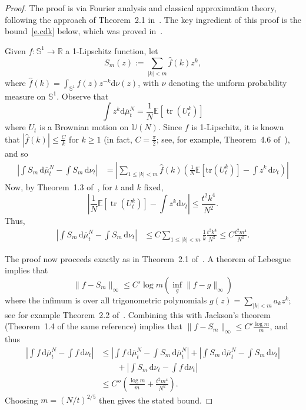 \documentclass[11pt]{article}
\theoremstyle{definition}
\numberwithin{equation}{section}
\numberwithin{figure}{section}
\numberwithin{table}{section}
\DeclareMathOperator{\tr}{tr}
\newcommand{\Unitary}[1]{\mathbb{U}\left(#1\right)}
\newcommand{\E}{\mathbb{E}}
\newcommand*{\dd}{\mathrm{d}}
\newcommand*{\dnu}{\dd \nu}
\newcommand*{\dbmu}{\dd \overline{\mu}}
\begin{document}
\begin{proof}
The proof is via Fourier analysis and classical approximation theory, following the approach of Theorem~2.1 in~\cite{MM-PTRF-2013}. The key ingredient of this proof is the bound~\eqref{e.cdk} below, which was proved in~\cite{CDK2016}.

Given $f:\mathbb{S}^1\rightarrow\mathbb{R}$ a 1-Lipschitz function, let
\[
S_m(z) := \sum_{|k|<m} \hat{f}(k)z^{k},
\]
where $\hat{f}(k)=\int_{\mathbb{S}^1}f(z)z^{-k}\dnu(z)$, with $\nu$ denoting the uniform probability measure on $\mathbb{S}^1$. Observe that
\[
\int z^k\dbmu^N_t=\frac{1}{N}\E[\tr(U_t^k)]
\]
where $U_t$ is a Brownian motion on $\Unitary{N}$. Since $f$ is 1-Lipschitz, it is known that $|\hat{f}(k)|\le \frac{C}{k}$ for $k\ge 1$ (in fact, $C=\frac{\pi}{2}$; see, for example, Theorem~4.6 of~\cite{Katznelson2004}), and so
\begin{align*}
\left|\int S_m\,\dbmu^N_t -\int S_m\,\dnu_t\right| &= \left|\sum_{1\le|k|<m} \hat{f}(k)
\left(\frac{1}{N}\mathbb{E}[\mathrm{tr} (U_t^k)] - \int z^k\,\dnu_t\right) \right|
\end{align*}
Now, by Theorem~1.3 of~\cite{CDK2016}, for $t$ and $k$ fixed,
\begin{equation}\label{e.cdk}
\left|\frac{1}{N}\E[\tr(U_t^k)]-\int z^k\dnu_t\right|\le\frac{t^2k^4}{N^2}.
\end{equation}
Thus,
\begin{align*}
\left|\int S_m\,\dbmu^N_t -\int S_m\,\dnu_t\right| &\le C\sum_{1\le|k|<m}\frac{1}{k}\frac{t^2k^4}{N^2}
\le C\frac{t^2m^4}{N^2}.
\end{align*}

The proof now proceeds exactly as in Theorem~2.1 of~\cite{MM-PTRF-2013}. A theorem of Lebesgue implies that
\[
\|f-S_m\|_\infty \le C'\log m\left(\inf_g \|f-g\|_\infty\right)
\]
where the infimum is over all trigonometric polynomials $g(z)=\sum_{|k|<m}a_kz^k$; see for example Theorem~2.2 of~\cite{Rivlin1981}. Combining this with Jackson's theorem (Theorem~1.4 of the same reference) implies that $\|f-S_m\|_\infty\le C'\frac{\log m}{m}$, and thus
\begin{align*}
\left|\int f\,\dbmu^N_t-\int f\,\dnu_t\right| &\le \left|\int f\,\dbmu^N_t-\int S_m\,\dbmu^N_t\right| + \left|\int S_m\,\dbmu^N_t-\int S_m\,\dnu_t\right| \\
& \qquad + \left|\int S_m\,\dnu_t-\int f\,\dnu_t\right|\\
&\le C''\left(\frac{\log m}{m} + \frac{t^2m^4}{N^2}\right).
\end{align*}
Choosing $m=(N/t)^{2/5}$ then gives the stated bound.
\end{proof}
\end{document}
